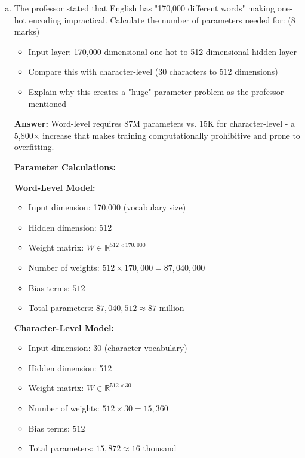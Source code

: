 \documentclass[12pt]{article}
\newcommand{\answer}[1]{{\color{answercolor}\textbf{Answer:} #1}}
\newcommand{\explanation}[1]{{\color{explanationcolor}#1}}
\begin{document}
\begin{enumerate}[(a)]
    \item The professor stated that English has "170,000 different words" making one-hot encoding impractical. Calculate the number of parameters needed for: \hfill (8 marks)
    \begin{itemize}
        \item Input layer: 170,000-dimensional one-hot to 512-dimensional hidden layer
        \item Compare this with character-level (30 characters to 512 dimensions)
        \item Explain why this creates a "huge" parameter problem as the professor mentioned
    \end{itemize}
    
    \answer{Word-level requires 87M parameters vs. 15K for character-level - a 5,800× increase that makes training computationally prohibitive and prone to overfitting.}
    
    \explanation{
    \textbf{Parameter Calculations:}
    
    \textbf{Word-Level Model:}
    \begin{itemize}
        \item Input dimension: 170,000 (vocabulary size)
        \item Hidden dimension: 512
        \item Weight matrix: $W \in \mathbb{R}^{512 \times 170,000}$
        \item Number of weights: $512 \times 170,000 = 87,040,000$
        \item Bias terms: $512$
        \item Total parameters: $87,040,512 \approx 87$ million
    \end{itemize}
    
    \textbf{Character-Level Model:}
    \begin{itemize}
        \item Input dimension: 30 (character vocabulary)
        \item Hidden dimension: 512
        \item Weight matrix: $W \in \mathbb{R}^{512 \times 30}$
        \item Number of weights: $512 \times 30 = 15,360$
        \item Bias terms: $512$
        \item Total parameters: $15,872 \approx 16$ thousand
    \end{itemize}
    
}
\end{enumerate}
\end{document}
